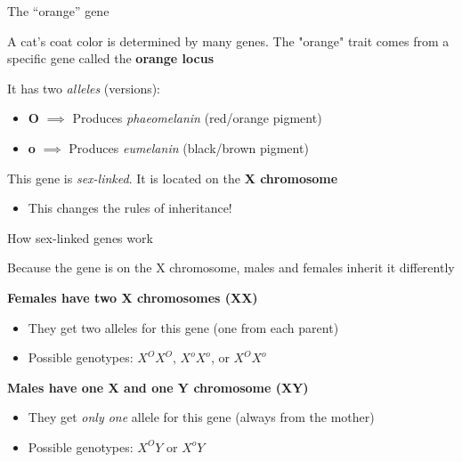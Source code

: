 \documentclass[aspectratio=169]{beamer}\usepackage[]{graphicx}\usepackage[]{xcolor}
\begin{document}
\begin{frame}{The ``orange'' gene}
    
    A cat's coat color is determined by many genes. The "orange" trait comes from a specific gene called the \textbf{orange locus}
    
    \vfill
    
    It has two \emph{alleles} (versions):
    \begin{itemize}
        \item \textbf{O} $\implies$ Produces \emph{phaeomelanin} (red/orange pigment)
        \item \textbf{o} $\implies$ Produces \emph{eumelanin} (black/brown pigment)
    \end{itemize}
    
    \vfill
    
    This gene is \emph{sex-linked}. It is located on the \textbf{X chromosome}
    \begin{itemize}
        \item This changes the rules of inheritance!
    \end{itemize}
    
\end{frame}

\begin{frame}{How sex-linked genes work}
    
    Because the gene is on the X chromosome, males and females inherit it differently
    
    \vfill
    
    \textbf{Females have two X chromosomes (XX)}
    \begin{itemize}
        \item They get two alleles for this gene (one from each parent)
        \item Possible genotypes: $X^O X^O$, $X^o X^o$, or $X^O X^o$
    \end{itemize}
    
    \vfill
    
    \textbf{Males have one X and one Y chromosome (XY)}
    \begin{itemize}
        \item They get \emph{only one} allele for this gene (always from the mother)
        \item Possible genotypes: $X^O Y$ or $X^o Y$
    \end{itemize}
    
\end{frame}
\end{document}
